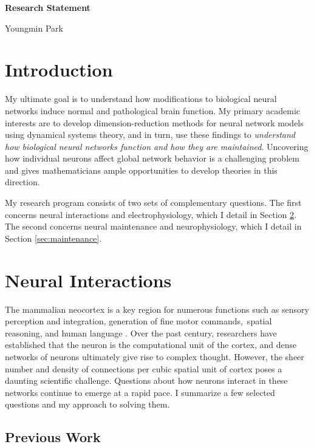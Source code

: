 \documentclass[a4paper,11pt]{article}
\begin{document}
\begin{center}
\Large \textbf{Research Statement}

\Large Youngmin Park
\end{center}


\section{Introduction}

My ultimate goal is to understand how modifications to biological neural networks induce normal and pathological brain function. My primary academic interests are to develop dimension-reduction methods for neural network models using dynamical systems theory, and in turn, use these findings to \textit{understand how biological neural networks function and how they are maintained}. Uncovering how individual neurons affect global network behavior is a challenging problem and gives mathematicians ample opportunities to develop theories in this direction.

My research program consists of two sets of complementary questions. The first concerns neural interactions and electrophysiology, which I detail in Section \ref{sec:interactions}. The second concerns neural maintenance and neurophysiology, which I detail in Section \ref{sec:maintenance}.

\section{Neural Interactions}\label{sec:interactions}

The mammalian neocortex is a key region for numerous functions such as sensory perception and integration, generation of fine motor commands, spatial reasoning, and human language \cite{fuster2002frontal}. Over the past century, researchers have established that the neuron is the computational unit of the cortex, and dense networks of neurons ultimately give rise to complex thought. However, the sheer number and density of connections per cubic spatial unit of cortex poses a daunting scientific challenge. Questions about how neurons interact in these networks continue to emerge at a rapid pace. I summarize a few selected questions and my approach to solving them.

\subsection{Previous Work}
\end{document}
